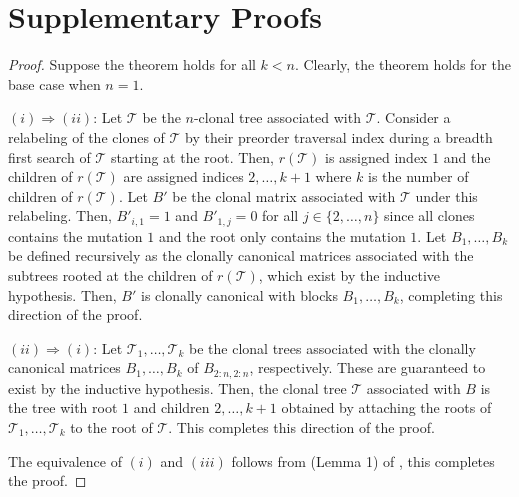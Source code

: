 \documentclass[10pt]{article}
\newcommand{\tree}{\mathcal{T}}
\begin{document}
\section{Supplementary Proofs}
\clonallycanonical*
\begin{proof}
    Suppose the theorem holds for all $k < n$. Clearly, the theorem holds for the base case when $n = 1$.

    $(i) \Rightarrow (ii)$: Let $\tree$ be the $n$-clonal tree associated with $\tree$. Consider a 
    relabeling of the clones of $\tree$ by their preorder traversal index during a breadth first search
    of $\tree$ starting at the root. Then, $r(\tree)$ is assigned index $1$ and the children of $r(\tree)$ 
    are assigned indices $2, \ldots, k + 1$ where $k$ is the number of children of $r(\tree)$. Let $B'$
    be the clonal matrix associated with $\tree$ under this relabeling. Then, $B'_{i,1} = 1$
    and $B'_{1, j} = 0$ for all $j \in \{2, \ldots, n\}$ since all clones contains the mutation $1$ 
    and the root only contains the mutation $1$. Let $B_1, \ldots, B_k$ be defined recursively
    as the clonally canonical matrices associated with the subtrees rooted at the children of $r(\tree)$,
    which exist by the inductive hypothesis. Then, $B'$ is clonally canonical with blocks $B_1, \ldots, B_k$,
    completing this direction of the proof.

    $(ii) \Rightarrow (i)$: Let $\tree_1, \ldots, \tree_k$ be the clonal trees associated with the
    clonally canonical matrices $B_1, \ldots, B_k$ of $B_{2:n, 2:n}$, respectively. These 
    are guaranteed to exist by the inductive hypothesis. Then, the clonal 
    tree $\tree$ associated with $B$ is the tree with root $1$ and children $2, \ldots, k + 1$ obtained
    by attaching the roots of $\tree_1, \ldots, \tree_k$ to the root of $\tree$. This completes
    this direction of the proof.

    The equivalence of $(i)$ and $(iii)$ follows from (Lemma 1) of \cite{el-kebir_reconstruction_2015},
    this completes the proof.
\end{proof}
\end{document}
